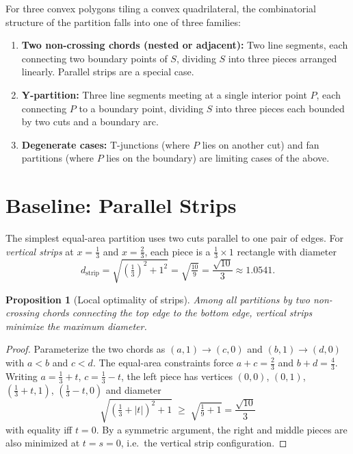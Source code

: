 \documentclass[11pt]{article}
\newtheorem{proposition}[theorem]{Proposition}
\theoremstyle{definition}
\begin{document}
For three convex polygons tiling a convex quadrilateral, the combinatorial
structure of the partition falls into one of three families:

\begin{enumerate}
\item \textbf{Two non-crossing chords (nested or adjacent):}
  Two line segments, each connecting two boundary points of $S$,
  dividing $S$ into three pieces arranged linearly.
  Parallel strips are a special case.

\item \textbf{Y-partition:}
  Three line segments meeting at a single interior point $P$, each
  connecting $P$ to a boundary point, dividing $S$ into three pieces
  each bounded by two cuts and a boundary arc.

\item \textbf{Degenerate cases:}
  T-junctions (where $P$ lies on another cut) and fan partitions
  (where $P$ lies on the boundary) are limiting cases of the above.
\end{enumerate}

\section{Baseline: Parallel Strips}

The simplest equal-area partition uses two cuts parallel to one pair of
edges. For \emph{vertical strips} at $x = \tfrac{1}{3}$ and $x =
\tfrac{2}{3}$, each piece is a $\tfrac{1}{3} \times 1$ rectangle with
diameter
\[
  d_{\text{strip}} = \sqrt{\left(\tfrac{1}{3}\right)^2 + 1^2}
  = \sqrt{\tfrac{10}{9}} = \frac{\sqrt{10}}{3} \approx 1.0541.
\]

\begin{proposition}[Local optimality of strips]
Among all partitions by two non-crossing chords connecting the top edge
to the bottom edge, vertical strips minimize the maximum diameter.
\end{proposition}

\begin{proof}
Parameterize the two chords as $(a,1) \to (c,0)$ and $(b,1) \to (d,0)$
with $a < b$ and $c < d$.  The equal-area constraints force $a+c =
\tfrac{2}{3}$ and $b+d = \tfrac{4}{3}$.  Writing $a = \tfrac{1}{3}+t$,
$c = \tfrac{1}{3}-t$, the left piece has vertices $(0,0)$, $(0,1)$,
$(\tfrac{1}{3}+t, 1)$, $(\tfrac{1}{3}-t, 0)$ and diameter
\[
  \sqrt{\left(\tfrac{1}{3}+|t|\right)^2 + 1} \;\geq\; \sqrt{\tfrac{1}{9}+1}
  = \frac{\sqrt{10}}{3}
\]
with equality iff $t=0$.  By a symmetric argument, the right and middle
pieces are also minimized at $t = s = 0$, i.e.\ the vertical strip
configuration.
\end{proof}
\end{document}
